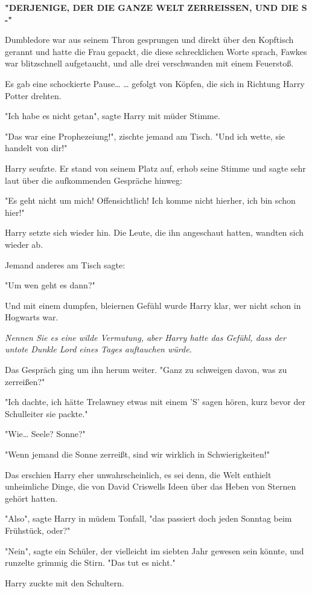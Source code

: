 {\textbf{"DERJENIGE, DER DIE GANZE WELT ZERREISSEN, UND DIE S -"}

Dumbledore war aus seinem Thron gesprungen und direkt über den Kopftisch gerannt und hatte die Frau gepackt, die diese schrecklichen Worte sprach, Fawkes war blitzschnell aufgetaucht, und alle drei verschwanden mit einem Feuerstoß.

Es gab eine schockierte Pause… … gefolgt von Köpfen, die sich in Richtung Harry Potter drehten.

"Ich habe es nicht getan", sagte Harry mit müder Stimme.

"Das war eine Prophezeiung!", zischte jemand am Tisch. "Und ich wette, sie handelt von dir!"

Harry seufzte. Er stand von seinem Platz auf, erhob seine Stimme und sagte sehr laut über die aufkommenden Gespräche hinweg:

"Es geht nicht um mich! Offensichtlich! Ich komme nicht hierher, ich bin schon hier!"

Harry setzte sich wieder hin. Die Leute, die ihn angeschaut hatten, wandten sich wieder ab.

Jemand anderes am Tisch sagte:

"Um wen geht es dann?"

Und mit einem dumpfen, bleiernen Gefühl wurde Harry klar, wer nicht schon in Hogwarts war.

\emph{Nennen Sie es eine wilde Vermutung, aber Harry hatte das Gefühl, dass der untote Dunkle Lord eines Tages auftauchen würde.}

Das Gespräch ging um ihn herum weiter. "Ganz zu schweigen davon, was zu zerreißen?"

"Ich dachte, ich hätte Trelawney etwas mit einem 'S' sagen hören, kurz bevor der Schulleiter sie packte."

"Wie… Seele? Sonne?"

"Wenn jemand die Sonne zerreißt, sind wir wirklich in Schwierigkeiten!"

Das erschien Harry eher unwahrscheinlich, es sei denn, die Welt enthielt unheimliche Dinge, die von David Criswells Ideen über das Heben von Sternen gehört hatten.

"Also", sagte Harry in müdem Tonfall, "das passiert doch jeden Sonntag beim Frühstück, oder?"

"Nein", sagte ein Schüler, der vielleicht im siebten Jahr gewesen sein könnte, und runzelte grimmig die Stirn. "Das tut es nicht."

Harry zuckte mit den Schultern.

}

